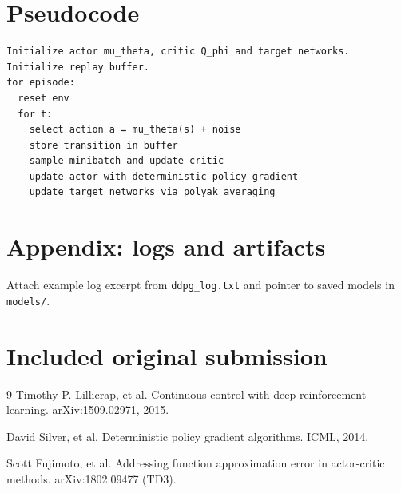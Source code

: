 \documentclass[11pt]{article}
\begin{document}
\section{Pseudocode}
\begin{verbatim}
Initialize actor mu_theta, critic Q_phi and target networks.
Initialize replay buffer.
for episode:
  reset env
  for t:
    select action a = mu_theta(s) + noise
    store transition in buffer
    sample minibatch and update critic
    update actor with deterministic policy gradient
    update target networks via polyak averaging
\end{verbatim}

\section{Appendix: logs and artifacts}
Attach example log excerpt from \texttt{ddpg\_log.txt} and pointer to saved models in \texttt{models/}.

\section{Included original submission}
\bigskip


\clearpage
\begin{thebibliography}{9}
Timothy P. Lillicrap, et al. Continuous control with deep reinforcement learning. arXiv:1509.02971, 2015.

David Silver, et al. Deterministic policy gradient algorithms. ICML, 2014.

Scott Fujimoto, et al. Addressing function approximation error in actor-critic methods. arXiv:1802.09477 (TD3).
\end{thebibliography}
\end{document}

